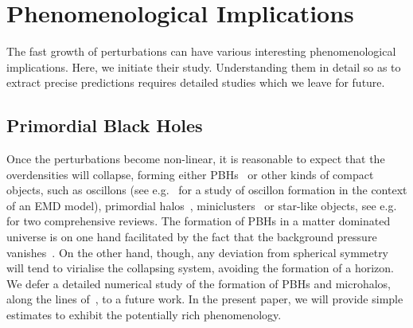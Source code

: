 \documentclass[a4paper, amsfonts, amssymb, amsmath, reprint, showkeys, nofootinbib, twoside, superscriptaddress]{revtex4-1}
\begin{document}
\section{Phenomenological Implications}
\label{pheno}
%

  The fast growth of perturbations can have various interesting phenomenological implications. Here, we initiate their study. Understanding them in detail
so as to extract precise predictions requires detailed studies which we leave for future.

\subsection{Primordial Black Holes}
\label{sec:PBHs}

Once the perturbations become non-linear, it is reasonable to expect that the overdensities will collapse, forming either PBHs~\cite{1966AZh, 10.1093/mnras/152.1.75, Grindlay:1975eb, Chapline:1975ojl, Khlopov:1980mg, Polnarev:1985btg, Carr:2016drx} or other kinds of compact objects, such as oscillons (see e.g.~\cite{Antusch:2017flz} for a study of oscillon formation in the context of an EMD model), primordial halos~\cite{Savastano:2019zpr}, miniclusters~\cite{Hogan:1988mp, Fairbairn:2017sil} or star-like objects, see e.g.~\cite{Krippendorf:2018tei, Visinelli:2021uve} for two comprehensive reviews. The formation of PBHs in a matter dominated universe is on one hand facilitated by the fact that the background pressure vanishes~\cite{Harada:2016mhb}. On the other hand, though, any deviation from spherical symmetry will tend to virialise the collapsing system, avoiding the formation of a horizon. We defer a detailed numerical study of the formation of PBHs and microhalos, along the lines of~\cite{Helfer:2016ljl, Widdicombe:2018oeo, Muia:2019coe, Nazari:2020fmk, Eggemeier:2020zeg, Eggemeier:2021smj}, to a future work. In the present paper, we will provide simple estimates to exhibit the potentially rich phenomenology.\\
\end{document}

